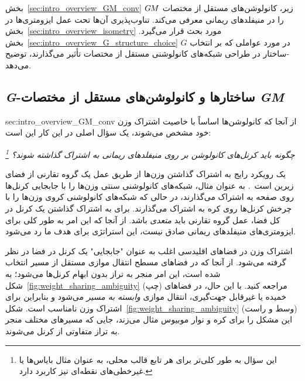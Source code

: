 بخش~\ref{sec:intro_overview_GM_conv} زیر، کانولوشن‌های مستقل از مختصات $G\mkern-1.4muM$ را در منیفلدهای ریمانی معرفی می‌کند.
تناوب‌پذیری آن‌ها تحت عمل ایزومتری‌ها در بخش~\ref{sec:intro_overview_isometry} مورد بحث قرار می‌گیرد.
بخش~\ref{sec:intro_overview_G_structure_choice} در مورد عواملی که بر انتخاب $G$-ساختار در طراحی شبکه‌های کانولوشنی مستقل از مختصات تأثیر می‌گذارند، توضیح می‌دهد.


\toclesslab\subsection{\textit{G}-ساختارها و کانولوشن‌های مستقل از مختصات \textit{GM}}{sec:intro_overview_GM_conv}
از آنجا که کانولوشن‌ها اساساً با خاصیت اشتراک وزن خود مشخص می‌شوند، یک سؤال اصلی در این کار این است:
\vspace*{-1ex}
\begin{center}\it
	چگونه باید کرنل‌های کانولوشن بر روی منیفلدهای ریمانی به اشتراک گذاشته شوند؟
	\footnote{
		این سؤال به طور کلی‌تر برای هر تابع قالب محلی، به عنوان مثال بایاس‌ها یا غیرخطی‌های نقطه‌ای نیز کاربرد دارد.
	}
\end{center}

\marginnote{} %


یک رویکرد رایج  به اشتراک گذاشتن وزن‌ها از طریق عمل یک گروه تقارنی از فضای زیرین است~\cite{Cohen2016-GCNN,Kondor2018-GENERAL}.
به عنوان مثال، شبکه‌های کانولوشنی سنتی وزن‌ها را با جابجایی کرنل‌ها روی صفحه به اشتراک می‌گذارند، در حالی که شبکه‌های کانولوشنی کروی وزن‌ها را با چرخش کرنل‌ها روی کره به اشتراک می‌گذارند.
برای به اشتراک گذاشتن یک کرنل در کل فضا، عمل گروه تقارنی باید \emph{متعدی} باشد.
از آنجا که این امر به طور کلی برای ایزومتری‌های منیفلدهای ریمانی صادق نیست، این استراتژی برای هدف ما رد می‌شود.


اشتراک وزن در فضاهای اقلیدسی اغلب به عنوان "جابجایی" یک کرنل در فضا در نظر گرفته می‌شود.
از آنجا که در فضاهای مسطح انتقال موازی مستقل از مسیر انتخاب شده است، این امر منجر به تراز بدون ابهام کرنل‌ها می‌شود؛ به شکل~\ref{fig:weight_sharing_ambiguity} (چپ) مراجعه کنید.
با این حال، در فضاهای خمیده یا غیرقابل جهت‌گیری، انتقال موازی \emph{وابسته به مسیر} می‌شود و بنابراین برای اشتراک وزن نامناسب است.
شکل~\ref{fig:weight_sharing_ambiguity} (وسط و راست) این مشکل را برای کره و نوار موبیوس مثال می‌زند، جایی که مسیرهای مختلف منجر به تراز متفاوتی از کرنل می‌شوند.


